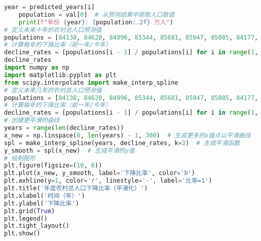 \begin{lstlisting}[language=python,caption={城乡人口}]
    year = predicted_years[i]
    population = val[0]  # 从预测结果中获取人口数值
    print(f"年份 {year}: {population:.2f} 万人")
# 定义未来十年的农村总人口预测值
populations = [84138, 84620, 84996, 85344, 85681, 85947, 85085, 84177, 83153, 82038, 80837, 79563, 78241, 76851, 75705, 74544, 73160, 71496, 70399, 68938, 67113, 64989, 63747, 62224, 60908, 59024, 57308, 55668, 54108, 52582, 50992, 49835, 49104,47548.48, 46795.32, 46118.73, 45412.10, 44972.02, 44588.71, 44266.00, 44038.31, 43850.55, 43703.22]
# 计算每年的下降比率（前一年/今年）
decline_rates = [populations[i - 1] / populations[i] for i in range(1, len(populations))]
decline_rates
import numpy as np
import matplotlib.pyplot as plt
from scipy.interpolate import make_interp_spline
# 定义未来几年的农村总人口预测值
populations = [84138, 84620, 84996, 85344, 85681, 85947, 85085, 84177, 83153, 82038, 80837, 79563, 78241, 76851, 75705, 74544, 73160, 71496, 70399, 68938, 67113, 64989, 63747, 62224, 60908, 59024, 57308, 55668, 54108, 52582, 50992, 49835, 49104, 47548.48, 46795.32, 46118.73, 45412.10, 44972.02, 44588.71, 44266.00, 44038.31, 43850.55, 43703.22]
# 计算每年的下降比率（前一年/今年）
decline_rates = [populations[i - 1] / populations[i] for i in range(1, len(populations))]
# 创建更平滑的曲线
years = range(len(decline_rates))
x_new = np.linspace(0, len(years) - 1, 300)  # 生成更多的x值点以平滑曲线
spl = make_interp_spline(years, decline_rates, k=3)  # 生成平滑函数
y_smooth = spl(x_new)  # 生成平滑的y值
# 绘制图形
plt.figure(figsize=(10, 6))
plt.plot(x_new, y_smooth, label='下降比率', color='b')
plt.axhline(y=1, color='r', linestyle='-', label='比率=1')
plt.title('年度农村总人口下降比率（平滑化）')
plt.xlabel('时间（年）')
plt.ylabel('下降比率')
plt.grid(True)
plt.legend()
plt.tight_layout()
plt.show()
\end{lstlisting}